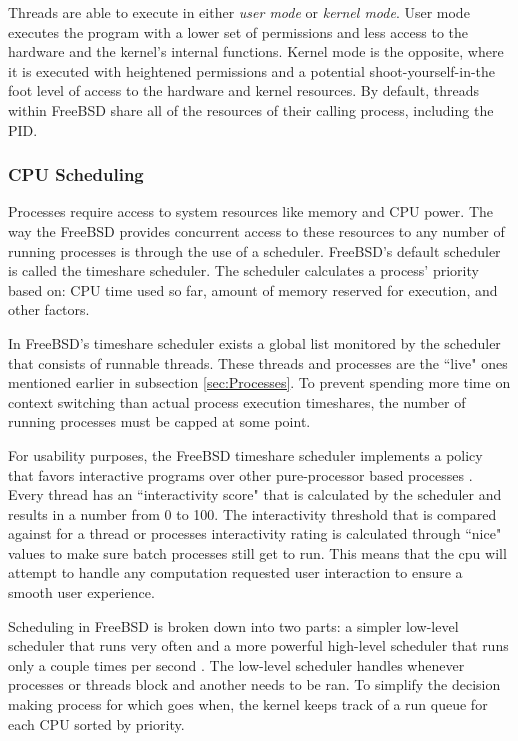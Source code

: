 \documentclass[10pt,draftclsnofoot,onecolumn]{IEEEtran}
\begin{document}
\par Threads are able to execute in either \textit{user mode} or \textit{kernel mode}.
User mode executes the program with a lower set of permissions and less access to the hardware and the kernel's internal functions.
Kernel mode is the opposite, where it is executed with heightened permissions and a potential shoot-yourself-in-the foot level of access to the hardware and kernel resources.
By default, threads within FreeBSD share all of the resources of their calling process, including the PID.

\subsubsection{CPU Scheduling}
\label{sub:CPU Scheduling FreeBSD}
\par Processes require access to system resources like memory and CPU power.
The way the FreeBSD provides concurrent access to these resources to any number of running processes is through the use of a scheduler.
FreeBSD's default scheduler is called the timeshare scheduler.
The scheduler calculates a process' priority based on: CPU time used so far, amount of memory reserved for execution, and other factors.

\par In FreeBSD's timeshare scheduler exists a global list monitored by the scheduler that consists of runnable threads.
These threads and processes are the ``live" ones mentioned earlier in subsection \ref{sec:Processes}.
To prevent spending more time on context switching than actual process execution timeshares, the number of running processes must be capped at some point.

\par For usability purposes, the FreeBSD timeshare scheduler implements a policy that favors interactive programs over other pure-processor based processes \cite{bsd:1}.
Every thread has an ``interactivity score" that is calculated by the scheduler and results in a number from 0 to 100.
The interactivity threshold that is compared against for a thread or processes interactivity rating is calculated through ``nice" values to make sure batch processes still get to run.
This means that the cpu will attempt to handle any computation requested user interaction to ensure a smooth user experience.

\par Scheduling in FreeBSD is broken down into two parts: a simpler low-level scheduler that runs very often and a more powerful high-level scheduler that runs only a couple times per second \cite{bsd:1}.
The low-level scheduler handles whenever processes or threads block and another needs to be ran.
To simplify the decision making process for which goes when, the kernel keeps track of a run queue for each CPU sorted by priority.
\end{document}
